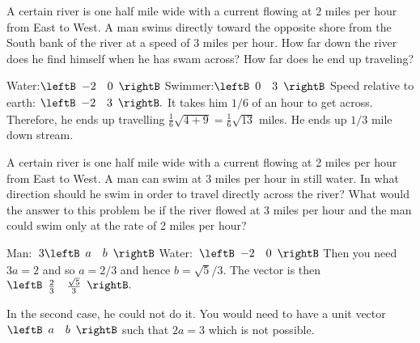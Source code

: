 \begin{enumialphparenastyle}
\begin{ex} A certain river is one half mile wide with a current flowing at $2$
miles per hour from East to West. A man swims directly toward the
opposite shore from the South bank of the river at a speed of $3$ miles
per hour. How far down the river does he find himself when he has swam
across? How far does he end up traveling? \vspace{1mm}
\begin{sol}
Water:$\leftB \begin{array}{rr}
-2 & 0
\end{array}
\rightB $ 
Swimmer:$\leftB \begin{array}{rr}
0 & 3
\end{array}
\rightB $ 
Speed relative to earth: $\leftB
\begin{array}{rr}
 -2 & 3
\end{array}
\rightB .$ 
It takes him $1/6$ of an hour to get across. Therefore, he ends up travelling $\frac{1}{6}\sqrt{4+9}= \frac{1}{6}\sqrt{13}$ miles. He ends up $1/3$ mile
down stream.
\end{sol}
\end{ex}

\begin{ex} A certain river is one half mile wide with a current flowing at 2
miles per hour from East to West. A man can swim at $3$ miles per hour in
still water. In what direction should he swim in order to travel directly
across the river? What would the answer to this problem be if the river
flowed at 3 miles per hour and the man could swim only at the rate of 2
miles per hour? \vspace{1mm}
\begin{sol}
Man:\ $3\leftB \begin{array}{rr}
 a & b
\end{array}
\rightB $ 
Water:\ $\leftB \begin{array}{rr}
-2 & 0
\end{array}
\rightB $
Then you need $3a=2$ and so $a=2/3$ and hence $b=\sqrt{5}/3$. The vector is
then $\leftB \begin{array}{cc}
 \frac{2}{3} & \frac{\sqrt{5}}{3}
\end{array}
\rightB .$ 

In the second case, he
could not do it. You would need to have a unit vector $\leftB \begin{array}{rr} a & b
\end{array}
\rightB $
such that $2a=3$ which is not possible. 
\end{sol}
\end{ex}



\end{enumialphparenastyle}
